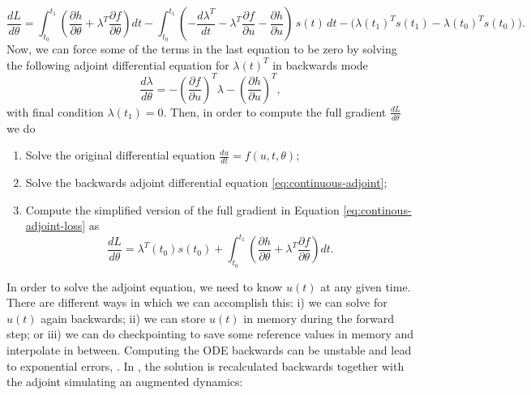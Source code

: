 \begin{equation}
    \frac{dL}{d\theta}
    = 
    \int_{t_0}^{t_1} \left( \frac{\partial h}{\partial \theta} + \lambda^T \frac{\partial f}{\partial \theta} \right) dt
    - 
    \int_{t_0}^{t_1} \left( - \frac{d\lambda^T}{dt} - \lambda^T \frac{\partial f}{\partial u} - \frac{\partial h}{\partial u} \right) \, s(t) \, dt
    -
    \bigg ( \lambda(t_1)^T s(t_1) - \lambda(t_0)^T s(t_0) \bigg ).
    \label{eq:continous-adjoint-loss}
\end{equation}
Now, we can force some of the terms in the last equation to be zero by solving the following adjoint differential equation for $\lambda(t)^T$ in backwards mode
\begin{equation}
    \frac{d\lambda}{d\theta} = - \left(\frac{\partial f}{\partial u}\right)^T \lambda - \left( \frac{\partial h}{\partial u} \right)^T,
    \label{eq:continuous-adjoint}
\end{equation}
with final condition $\lambda(t_1) = 0$. Then, in order to compute the full gradient $\frac{dL}{d\theta}$ we do
\begin{enumerate}
    \item Solve the original differential equation $\frac{du}{dt} = f(u, t, \theta)$;
    \item Solve the backwards adjoint differential equation \eqref{eq:continuous-adjoint};
    \item Compute the simplified version of the full gradient in Equation \eqref{eq:continous-adjoint-loss} as
    \begin{equation}
        \frac{dL}{d\theta} = \lambda^T (t_0) s(t_0) + \int_{t_0}^{t_1}  \left( \frac{\partial h}{\partial \theta} + \lambda^T \frac{\partial f}{\partial \theta} \right)  dt.
    \end{equation}
\end{enumerate}
In order to solve the adjoint equation, we need to know $u(t)$ at any given time. There are different ways in which we can accomplish this: i) we can solve for $u(t)$ again backwards; ii) we can store $u(t)$ in memory during the forward step; or iii) we can do checkpointing to save some reference values in memory and interpolate in between. 
Computing the ODE backwards can be unstable and lead to exponential errors, \cite{kim_stiff_2021}. 
In \cite{chen_neural_2019}, the solution is recalculated backwards together with the adjoint simulating an augmented dynamics: 
